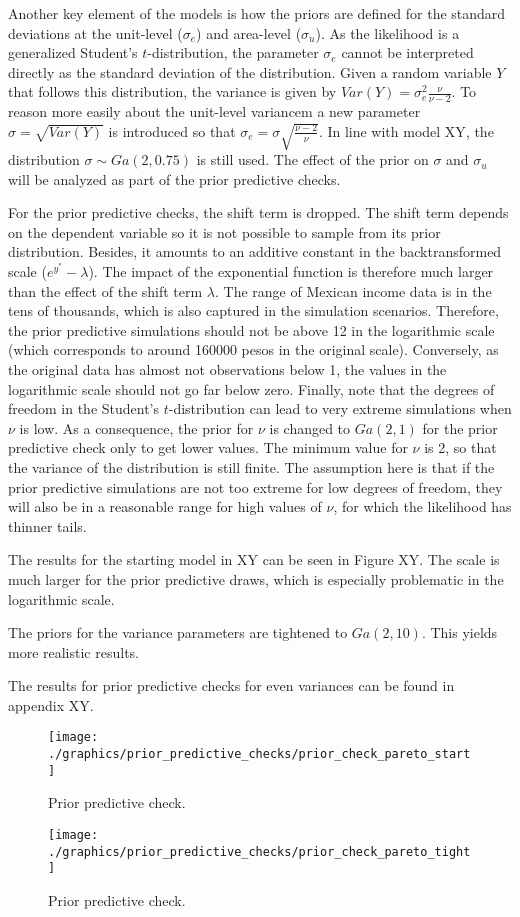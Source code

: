 Another key element of the models is how the priors are defined for the standard deviations at the unit-level ($\sigma_e$) and area-level ($\sigma_u$).
As the likelihood is a generalized Student's $t$-distribution, the parameter $\sigma_e$ cannot be interpreted directly as the standard deviation of the distribution.
Given a random variable $Y$ that follows this distribution, the variance is given by $Var(Y) = \sigma_e^2 \frac{\nu}{\nu - 2}$.
To reason more easily about the unit-level variancem a new parameter $\sigma = \sqrt{Var(Y)}$ is introduced so that $\sigma_e = \sigma \sqrt{\frac{\nu - 2}{\nu}}$.
In line with model XY, the distribution $\sigma \sim Ga(2, 0.75)$ is still used.
The effect of the prior on $\sigma$ and $\sigma_u$ will be analyzed as part of the prior predictive checks.

For the prior predictive checks, the shift term is dropped. The shift term depends on the dependent variable so it is not possible to sample from its prior distribution.
Besides, it amounts to an additive constant in the backtransformed scale ($e^{y^*} - \lambda$). The impact of the exponential function is therefore much larger than the effect of the shift term $\lambda$.
The range of Mexican income data is in the tens of thousands, which is also captured in the simulation scenarios.
Therefore, the prior predictive simulations should not be above 12 in the logarithmic scale (which corresponds to around 160000 pesos in the original scale).
Conversely, as the original data has almost not observations below 1, the values in the logarithmic scale should not go far below zero.
Finally, note that the degrees of freedom in the Student's $t$-distribution can lead to very extreme simulations when $\nu$ is low.
As a consequence, the prior for $\nu$ is changed to $Ga(2, 1)$ for the prior predictive check only to get lower values.
The minimum value for $\nu$ is 2, so that the variance of the distribution is still finite.
The assumption here is that if the prior predictive simulations are not too extreme for low degrees of freedom, they will also be in a reasonable range for high values of $\nu$, for which the likelihood has thinner tails.

The results for the starting model in XY can be seen in Figure XY.
The scale is much larger for the prior predictive draws, which is especially problematic in the logarithmic scale.

The priors for the variance parameters are tightened to $Ga(2, 10)$.
This yields more realistic results.

The results for prior predictive checks for even variances can be found in appendix XY.

\begin{figure}
    \texttt{[image: ./graphics/prior\_predictive\_checks/prior\_check\_pareto\_start]}
    \label{fig:ppc_start}
    \caption{Prior predictive check.}
\end{figure}

\begin{figure}
    \texttt{[image: ./graphics/prior\_predictive\_checks/prior\_check\_pareto\_tight]}
    \label{fig:ppc_tight}
    \caption{Prior predictive check.}
\end{figure}




